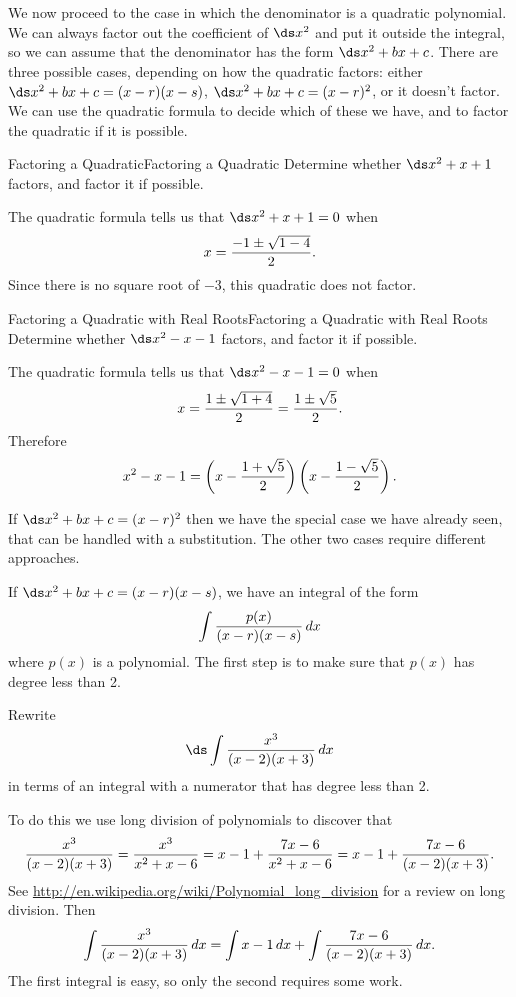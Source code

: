 We now proceed to the case in which the denominator is a quadratic
polynomial.  We can always factor out the coefficient of $\ds x^2$ and put
it outside the integral, so we can assume that the denominator has the
form $\ds x^2+bx+c$.  There are three possible cases, depending on how
the quadratic factors: either $\ds x^2+bx+c=(x-r)(x-s)$,
$\ds x^2+bx+c=(x-r)^2$, or it doesn't factor. We can use the quadratic
formula to decide which of these we have, and to factor the quadratic
if it is possible.

\begin{example}{Factoring a Quadratic}{Factoring a Quadratic}\label{Factoring a Quadratic}
Determine whether $\ds x^2+x+1$ factors, and factor it if possible.
\end{example}

\begin{solution}
The quadratic formula tells us that $\ds x^2+x+1=0$ when
$$x={-1\pm\sqrt{1-4}\over 2}.$$
Since there is no square root of $-3$, this quadratic does not factor.
\end{solution}

\begin{example}{Factoring a Quadratic with Real Roots}{Factoring a Quadratic with Real Roots}\label{Factoring a Quadratic with Real Roots}
Determine whether $\ds x^2-x-1$ factors, and factor it if possible.
\end{example}

\begin{solution}
The quadratic formula tells us that $\ds x^2-x-1=0$ when
$$x={1\pm\sqrt{1+4}\over 2}={1\pm\sqrt{5}\over2}.$$
Therefore
$$
  x^2-x-1=\left(x-{1+\sqrt{5}\over2}\right)\left(x-{1-\sqrt{5}\over2}\right).
$$
\end{solution}

If $\ds x^2+bx+c=(x-r)^2$ then we have the special case we have already
seen, that can be handled with a substitution. The other two cases
require different approaches.

If  $\ds x^2+bx+c=(x-r)(x-s)$, we have an integral of the form
$$\int{p(x)\over (x-r)(x-s)}\,dx$$
where $p(x)$ is a polynomial. The first step is to make sure that
$p(x)$ has degree less than 2.

\begin{example}{}{}\label{}
Rewrite $$\ds\int {x^3\over (x-2)(x+3)}\,dx$$ in terms of an integral
with a numerator that has degree less than 2. 
\end{example}

\begin{solution}
To do this we use long division of polynomials to 
discover that
$$
  {x^3\over (x-2)(x+3)}={x^3\over x^2+x-6}=x-1+{7x-6\over x^2+x-6}=
  x-1+{7x-6\over (x-2)(x+3)}.
$$
See \url{http://en.wikipedia.org/wiki/Polynomial_long_division} for a review on long division.
Then
$$
  \int {x^3\over (x-2)(x+3)}\,dx=\int x-1\,dx +\int {7x-6\over
  (x-2)(x+3)}\,dx.
$$
The first integral is easy, so only the second requires some work.
\end{solution}

